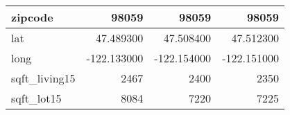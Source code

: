\begin{table}[H]
\begin{tabular}{|l|r|r|r|}
\hline zipcode & \cellcolor[rgb]{0.9, 0.54, 0.52} 98059 & \cellcolor[rgb]{0.9, 0.54, 0.52} 98059 & \cellcolor[rgb]{0.9, 0.54, 0.52} 98059 \\
\hline lat & \cellcolor[rgb]{0.9, 0.54, 0.52} 47.489300 & 47.508400 & 47.512300 \\
\hline long & \cellcolor[rgb]{0.9, 0.54, 0.52} -122.133000 & \cellcolor[rgb]{0.9, 0.54, 0.52} -122.154000 & \cellcolor[rgb]{0.9, 0.54, 0.52} -122.151000 \\
\hline sqft\_living15 & \cellcolor[rgb]{0.9, 0.54, 0.52} 2467 & 2400 & 2350 \\
\hline sqft\_lot15 & \cellcolor[rgb]{0.9, 0.54, 0.52} 8084 & 7220 & 7225 \\
\hline
\end{tabular}
\end{table}
